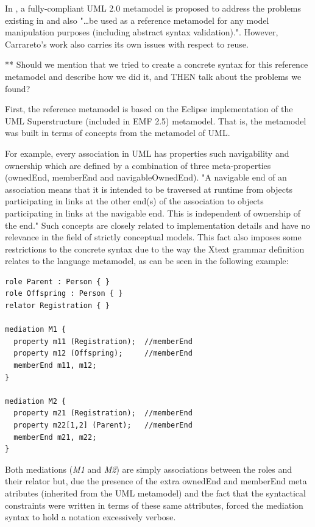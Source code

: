 \documentclass[
  10pt,				%
  oneside,
  a4paper,			%
  brazilian,
  english
]{abntex2}
\begin{document}
In \cite{carraretto10}, a fully-compliant UML 2.0 metamodel is proposed to
address the problems existing in \cite{benevides10} and also
"\ldots be used as a reference metamodel for any model manipulation purposes
(including abstract syntax validation).".
However, Carrareto's work also carries its own issues with respect to reuse.

** Should we mention that we tried to create a concrete syntax for this reference
metamodel and describe how we did it, and THEN talk about the problems we found?

First, the reference metamodel is based on the Eclipse implementation of the UML
Superstructure (included in EMF 2.5) metamodel. That is, the metamodel was built
in terms of concepts from the metamodel of UML.

For example, every association in UML has properties such navigability and ownership
which are defined by a combination of three meta-properties (ownedEnd, memberEnd
and navigableOwnedEnd).
%
"A navigable end of an association means that it is intended to be traversed at
runtime from objects participating in links at the other end(s) of the association
to objects participating in links at the navigable end.
This is independent of ownership of the end." \cite{UML20}
%
Such concepts are closely related to implementation details and have no relevance
in the field of strictly conceptual models.
%
This fact also imposes some restrictions to the concrete syntax due to the way
the Xtext grammar definition relates to the language metamodel, as can be seen in
the following example:

\begin{verbatim}
role Parent : Person { }
role Offspring : Person { }
relator Registration { }

mediation M1 {
  property m11 (Registration);  //memberEnd
  property m12 (Offspring);     //memberEnd
  memberEnd m11, m12;
}

mediation M2 {
  property m21 (Registration);  //memberEnd
  property m22[1,2] (Parent);   //memberEnd
  memberEnd m21, m22;
}
\end{verbatim}

Both mediations (\emph{M1} and \emph{M2}) are simply associations between the roles
and their relator but, due the presence of the extra ownedEnd and memberEnd meta
atributes (inherited from the UML metamodel) and the fact that the syntactical
constraints were written in terms of these same attributes, forced the mediation
syntax to hold a notation excessively verbose.
%
%
\end{document}

